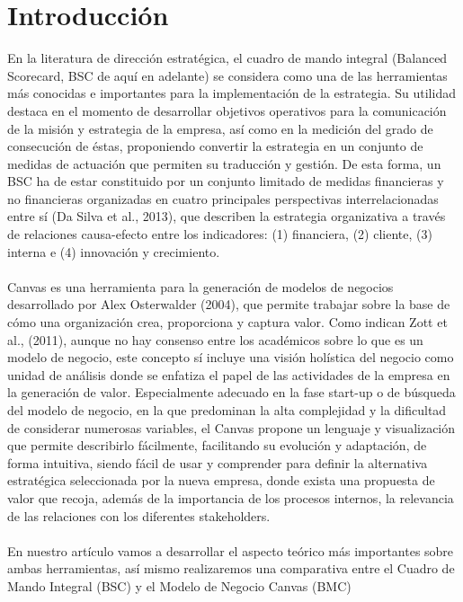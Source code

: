 \documentclass[preprint,12pt]{elsarticle}
\begin{document}
\section{Introducción}
En la literatura de dirección estratégica, el cuadro de mando integral (Balanced Scorecard, BSC de aquí en adelante) se considera como una de las herramientas más conocidas e importantes para la implementación de la estrategia. Su utilidad destaca en el momento de desarrollar objetivos operativos para la comunicación de la misión y estrategia de la empresa, así como en la medición del grado de consecución de éstas, proponiendo convertir la estrategia en un conjunto de medidas de actuación que permiten su traducción y gestión. De esta forma, un BSC ha de estar constituido por un conjunto limitado de medidas financieras y no financieras organizadas en cuatro principales perspectivas interrelacionadas entre sí (Da Silva et al., 2013), que describen la estrategia organizativa a través de relaciones causa-efecto entre los indicadores: (1) financiera, (2) cliente, (3) interna e (4) innovación y crecimiento.\\ \\

Canvas es una herramienta para la generación de modelos de negocios desarrollado por Alex Osterwalder (2004), que permite trabajar sobre la base de cómo una organización crea, proporciona y captura valor. Como indican Zott et al., (2011), aunque no hay consenso entre los académicos sobre lo que es un modelo de negocio, este concepto sí incluye una visión holística del negocio como unidad de análisis donde se enfatiza el papel de las actividades de la empresa en la generación de valor. Especialmente adecuado en la fase start-up o de búsqueda del modelo de negocio, en la que predominan la alta complejidad y la dificultad de considerar numerosas variables, el Canvas propone un lenguaje y visualización que permite describirlo fácilmente, facilitando su evolución y adaptación, de forma intuitiva, siendo fácil de usar y comprender para definir la alternativa estratégica seleccionada por la nueva empresa, donde exista una propuesta de valor que recoja, además de la importancia de los procesos internos, la relevancia de las relaciones con los diferentes stakeholders.\\ \\

En nuestro artículo vamos a desarrollar el aspecto teórico más importantes sobre ambas herramientas, así mismo realizaremos una comparativa entre el Cuadro de Mando Integral (BSC) y el Modelo de Negocio Canvas (BMC) 
\end{document}
